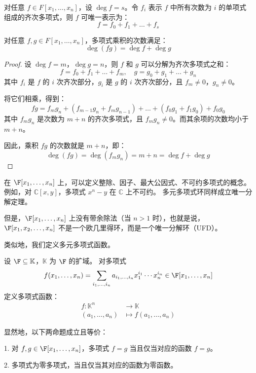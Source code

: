 对任意 \( f \in F[x_1,\dots,x_n] \)，设 \( \deg f = s \)。令 \( f_i \) 表示 \( f \) 中所有次数为 \( i \) 的单项式组成的齐次多项式，则 \( f \) 可唯一表示为：
\[
f = f_0 + f_1 + \dots + f_s
\]
\begin{definition}
	对任意 \( f,g \in F[x_1,\dots,x_n] \)，多项式乘积的次数满足：
	\[
	\deg(fg) = \deg f + \deg g
	\]
\end{definition}
\begin{proof}
	设 \( \deg f = m \)，\( \deg g = n \)，则 \( f \) 和 \( g \) 可以分解为齐次多项式之和：
	\[
	f = f_0 + f_1 + \dots + f_m, \quad g = g_0 + g_1 + \dots + g_n
	\]
	其中 \( f_i \) 是 \( f \) 的 \( i \) 次齐次部分，\( g_i \) 是 \( g \) 的 \( i \) 次齐次部分，且 \( f_m \neq 0 \)，\( g_n \neq 0 \)。
	
	将它们相乘，得到：
	\[
	fg = f_m g_n + (f_{m-1}g_n + f_m g_{n-1}) + \dots + (f_0 g_1 + f_1 g_0) + f_0 g_0
	\]
	其中 \( f_m g_n \) 是次数为 \( m+n \) 的齐次多项式，且 \( f_m g_n \neq 0 \)。而其余项的次数均小于 \( m+n \)。
	
	因此，乘积 \( fg \) 的次数就是 \( m+n \)，即：
	\[
	\deg(fg) = \deg(f_m g_n) = m + n = \deg f + \deg g
	\]
\end{proof}
在 \( \F[x_1,\dots,x_n] \) 上，可以定义整除、因子、最大公因式、不可约多项式的概念。
例如，对 \( \mathbb{C}[x,y] \)，多项式 \( x^n - y \) 在 \( \mathbb{C} \) 上不可约。
多元多项式环同样成立唯一分解定理。

但是，\( \F[x_1,\dots,x_n] \) 上没有带余除法（当 \( n>1 \) 时），也就是说，\( \F[x_1,x_2,\dots,x_n] \) 不是一个欧几里得环，而是一个唯一分解环（UFD）。


类似地，我们定义多元多项式函数。
\begin{definition}
	设 \( \F \subseteq \mathbb{K} \)，\( \mathbb{K}\) 为 \( \F \) 的扩域。
	对多项式
	\[
	f(x_1,\dots,x_n) = \sum_{i_1,\dots,i_n} a_{i_1,\dots,i_n} x_1^{i_1} \cdots x_n^{i_n} \in \F[x_1,\dots,x_n]
	\]
	定义多项式函数：
	\[
	\begin{aligned}
		f: \mathbb{K}^n &\to \mathbb{K} \\
		(a_1,\dots,a_n) &\mapsto f(a_1,\dots,a_n)
	\end{aligned}
	\]
\end{definition}


显然地，以下两命题成立且等价：

1.  对 \( f,g \in \F[x_1,\dots,x_n] \)，多项式 \( f=g \) 当且仅当对应的函数 \( f=g \)。

2.  多项式为零多项式，当且仅当其对应的函数为零函数。

